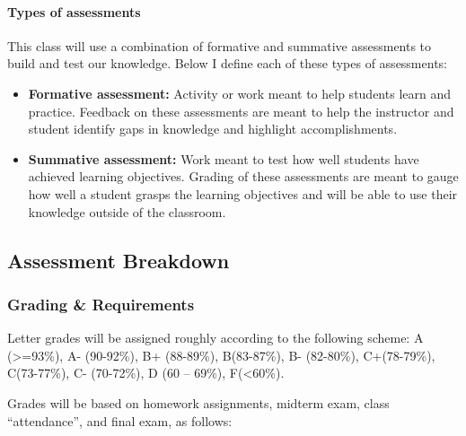 \documentclass[
  letterpaper,
  DIV=11,
  numbers=noendperiod]{scrartcl}
\let\oldparagraph\paragraph
\renewcommand{\paragraph}[1]{\oldparagraph{#1}\mbox{}}
\begin{document}
\hypertarget{types-of-assessments}{%
\paragraph{Types of assessments}\label{types-of-assessments}}

This class will use a combination of formative and summative assessments
to build and test our knowledge. Below I define each of these types of
assessments:

\begin{itemize}
\item
  \textbf{Formative assessment:} Activity or work meant to help students
  learn and practice. Feedback on these assessments are meant to help
  the instructor and student identify gaps in knowledge and highlight
  accomplishments.
\item
  \textbf{Summative assessment:} Work meant to test how well students
  have achieved learning objectives. Grading of these assessments are
  meant to gauge how well a student grasps the learning objectives and
  will be able to use their knowledge outside of the classroom.
\end{itemize}

\hypertarget{assessment-breakdown}{%
\subsection{Assessment Breakdown}\label{assessment-breakdown}}

\hypertarget{grading-requirements}{%
\subsubsection{Grading \& Requirements}\label{grading-requirements}}

Letter grades will be assigned roughly according to the following
scheme: A (\textgreater=93\%), A- (90-92\%), B+ (88-89\%), B(83-87\%),
B- (82-80\%), C+(78-79\%), C(73-77\%), C- (70-72\%), D (60 -- 69\%),
F(\textless60\%).

Grades will be based on homework assignments, midterm exam, class
``attendance'', and final exam, as follows:
\end{document}
